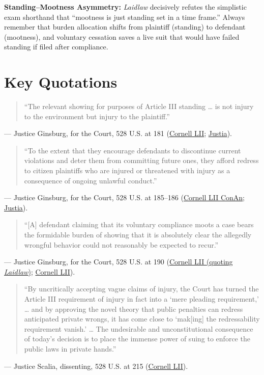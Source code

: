 \documentclass[12pt]{article}
\begin{document}
\textbf{Standing--Mootness Asymmetry:} \textit{Laidlaw} decisively refutes the simplistic exam shorthand that ``mootness is just standing set in a time frame.'' Always remember that burden allocation shifts from plaintiff (standing) to defendant (mootness), and voluntary cessation saves a live suit that would have failed standing if filed after compliance.

\section{Key Quotations}
\begin{quote}
``The relevant showing for purposes of Article III standing \ldots{} is not injury to the environment but injury to the plaintiff.''
\end{quote}
\noindent --- Justice Ginsburg, for the Court, 528 U.S. at 181 (\href{https://www.law.cornell.edu/supct/html/98-822.ZO.html}{Cornell LII}; \href{https://supreme.justia.com/cases/federal/us/528/167/}{Justia}).

\begin{quote}
``To the extent that they encourage defendants to discontinue current violations and deter them from committing future ones, they afford redress to citizen plaintiffs who are injured or threatened with injury as a consequence of ongoing unlawful conduct.''
\end{quote}
\noindent --- Justice Ginsburg, for the Court, 528 U.S. at 185--186 (\href{https://www.law.cornell.edu/constitution-conan/article-3/section-2/clause-1/redressability}{Cornell LII ConAn}; \href{https://supreme.justia.com/cases/federal/us/528/167/}{Justia}).

\begin{quote}
``[A] defendant claiming that its voluntary compliance moots a case bears the formidable burden of showing that it is absolutely clear the allegedly wrongful behavior could not reasonably be expected to recur.''
\end{quote}
\noindent --- Justice Ginsburg, for the Court, 528 U.S. at 190 (\href{https://www.law.cornell.edu/supremecourt/text/11-982}{Cornell LII (quoting \textit{Laidlaw})}; \href{https://www.law.cornell.edu/supremecourt/text/528/167}{Cornell LII}).

\begin{quote}
``By uncritically accepting vague claims of injury, the Court has turned the Article III requirement of injury in fact into a `mere pleading requirement,' \ldots{} and by approving the novel theory that public penalties can redress anticipated private wrongs, it has come close to `mak[ing] the redressability requirement vanish.' \ldots{} The undesirable and unconstitutional consequence of today's decision is to place the immense power of suing to enforce the public laws in private hands.''
\end{quote}
\noindent --- Justice Scalia, dissenting, 528 U.S. at 215 (\href{https://www.law.cornell.edu/supct/html/98-822.ZD.html}{Cornell LII}).
\end{document}
